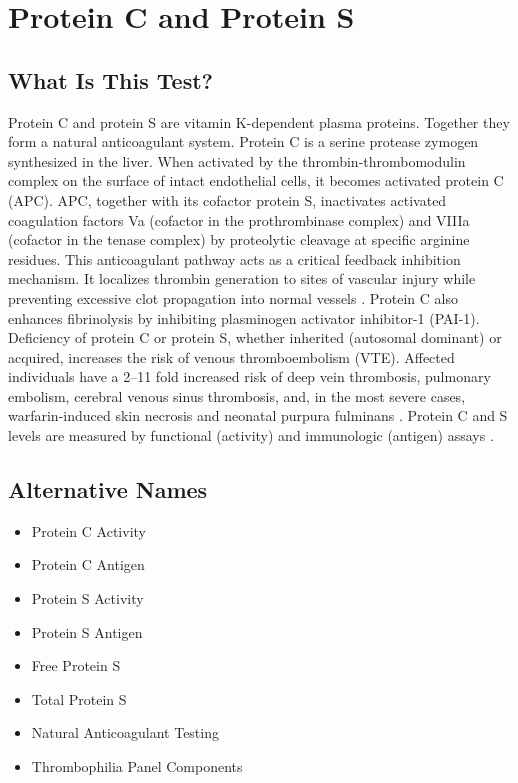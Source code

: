 \chapter{Protein C and Protein S}

\section*{What Is This Test?}
Protein C and protein S are vitamin K-dependent plasma proteins. Together they form a natural anticoagulant system. Protein C is a serine protease zymogen synthesized in the liver. When activated by the thrombin-thrombomodulin complex on the surface of intact endothelial cells, it becomes activated protein C (APC). APC, together with its cofactor protein S, inactivates activated coagulation factors Va (cofactor in the prothrombinase complex) and VIIIa (cofactor in the tenase complex) by proteolytic cleavage at specific arginine residues. This anticoagulant pathway acts as a critical feedback inhibition mechanism. It localizes thrombin generation to sites of vascular injury while preventing excessive clot propagation into normal vessels \cite{reitsma2012mechanistic}. Protein C also enhances fibrinolysis by inhibiting plasminogen activator inhibitor-1 (PAI-1). Deficiency of protein C or protein S, whether inherited (autosomal dominant) or acquired, increases the risk of venous thromboembolism (VTE). Affected individuals have a 2--11 fold increased risk of deep vein thrombosis, pulmonary embolism, cerebral venous sinus thrombosis, and, in the most severe cases, warfarin-induced skin necrosis and neonatal purpura fulminans \cite{dahlback2008advances}. Protein C and S levels are measured by functional (activity) and immunologic (antigen) assays \cite{tierney2023current}.

\section*{Alternative Names}
\begin{itemize}
  \item Protein C Activity
  \item Protein C Antigen
  \item Protein S Activity
  \item Protein S Antigen
  \item Free Protein S
  \item Total Protein S
  \item Natural Anticoagulant Testing
  \item Thrombophilia Panel Components
\end{itemize}
